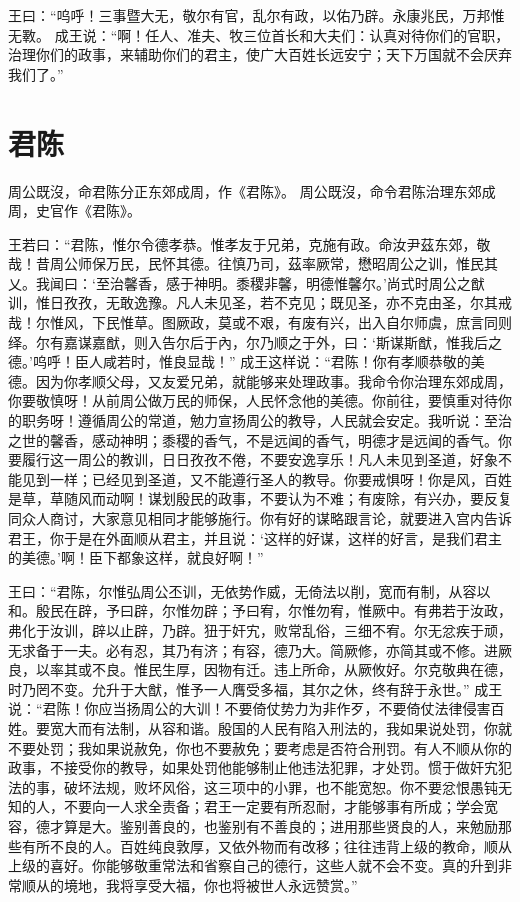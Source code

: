 \documentclass[a4paper,12pt,UTF8,twoside]{ctexbook}
\begin{document}
王曰：“呜呼！三事暨大无，敬尔有官，乱尔有政，以佑乃辟。永康兆民，万邦惟无斁。
成王说：“啊！任人、准夫、牧三位首长和大夫们：认真对待你们的官职，治理你们的政事，来辅助你们的君主，使广大百姓长远安宁；天下万国就不会厌弃我们了。”

\chapter{君陈}

周公既沒，命君陈分正东郊成周，作《君陈》。
周公既沒，命令君陈治理东郊成周，史官作《君陈》。

王若曰：“君陈，惟尔令德孝恭。惟孝友于兄弟，克施有政。命汝尹茲东郊，敬哉！昔周公师保万民，民怀其德。往慎乃司，茲率厥常，懋昭周公之训，惟民其乂。我闻曰：‘至治馨香，感于神明。黍稷非馨，明德惟馨尔。’尚式时周公之猷训，惟日孜孜，无敢逸豫。凡人未见圣，若不克见；既见圣，亦不克由圣，尔其戒哉！尔惟风，下民惟草。图厥政，莫或不艰，有废有兴，出入自尔师虞，庶言同则绎。尔有嘉谋嘉猷，则入告尔后于內，尔乃顺之于外，曰：‘斯谋斯猷，惟我后之德。’呜呼！臣人咸若时，惟良显哉！”
成王这样说：“君陈！你有孝顺恭敬的美德。因为你孝顺父母，又友爱兄弟，就能够来处理政事。我命令你治理东郊成周，你要敬慎呀！从前周公做万民的师保，人民怀念他的美德。你前往，要慎重对待你的职务呀！遵循周公的常道，勉力宣扬周公的教导，人民就会安定。我听说：至治之世的馨香，感动神明；黍稷的香气，不是远闻的香气，明德才是远闻的香气。你要履行这一周公的教训，日日孜孜不倦，不要安逸享乐！凡人未见到圣道，好象不能见到一样；已经见到圣道，又不能遵行圣人的教导。你要戒惧呀！你是风，百姓是草，草随风而动啊！谋划殷民的政事，不要认为不难；有废除，有兴办，要反复同众人商讨，大家意见相同才能够施行。你有好的谋略跟言论，就要进入宫内告诉君王，你于是在外面顺从君主，并且说：‘这样的好谋，这样的好言，是我们君主的美德。’啊！臣下都象这样，就良好啊！”

王曰：“君陈，尔惟弘周公丕训，无依势作威，无倚法以削，宽而有制，从容以和。殷民在辟，予曰辟，尔惟勿辟；予曰宥，尔惟勿宥，惟厥中。有弗若于汝政，弗化于汝训，辟以止辟，乃辟。狃于奸宄，败常乱俗，三细不宥。尔无忿疾于顽，无求备于一夫。必有忍，其乃有济；有容，德乃大。简厥修，亦简其或不修。进厥良，以率其或不良。惟民生厚，因物有迁。违上所命，从厥攸好。尔克敬典在德，时乃罔不变。允升于大猷，惟予一人膺受多福，其尔之休，终有辞于永世。”
成王说：“君陈！你应当扬周公的大训！不要倚仗势力为非作歹，不要倚仗法律侵害百姓。要宽大而有法制，从容和谐。殷国的人民有陷入刑法的，我如果说处罚，你就不要处罚；我如果说赦免，你也不要赦免；要考虑是否符合刑罚。有人不顺从你的政事，不接受你的教导，如果处罚他能够制止他违法犯罪，才处罚。惯于做奸宄犯法的事，破坏法规，败坏风俗，这三项中的小罪，也不能宽恕。你不要忿恨愚钝无知的人，不要向一人求全责备；君王一定要有所忍耐，才能够事有所成；学会宽容，德才算是大。鉴别善良的，也鉴别有不善良的；进用那些贤良的人，来勉励那些有所不良的人。百姓纯良敦厚，又依外物而有改移；往往违背上级的教命，顺从上级的喜好。你能够敬重常法和省察自己的德行，这些人就不会不变。真的升到非常顺从的境地，我将享受大福，你也将被世人永远赞赏。”
\end{document}
